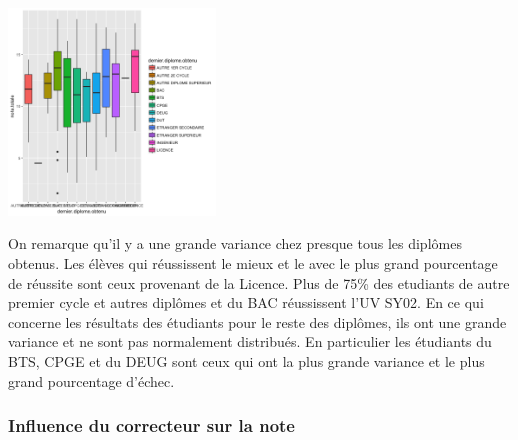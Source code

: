 \documentclass[10pt]{article}
\begin{document}
	\begin{center}
		\includegraphics[width=55mm]{Figures/Notes/diplome_resultat.png}
		\label{fig:formation_resultat}	
	\end{center}
	
	On remarque qu'il y a une grande variance chez presque tous les diplômes obtenus. Les élèves qui réussissent le mieux et le avec le plus grand pourcentage de réussite sont ceux provenant de la Licence.  Plus de 75\%  des etudiants de autre premier  cycle et autres diplômes et du BAC réussissent l'UV SY02. En ce qui concerne les résultats des étudiants pour le reste des diplômes, ils ont une grande variance et ne sont pas normalement distribués. En particulier les étudiants du BTS, CPGE et du DEUG sont ceux qui ont la plus grande variance et le plus grand pourcentage d'échec.
	
	\subsubsection{Influence du correcteur sur la note}
	
\end{document}
